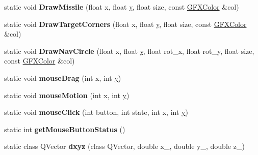 \begin{DoxyCompactItemize}
\item 
static void {\bfseries Draw\+Missile} (float x, float \hyperlink{IceUtils_8h_aa7ffaed69623192258fb8679569ff9ba}{y}, float size, const \hyperlink{structGFXColor}{G\+F\+X\+Color} \&col)\hypertarget{classNavigationSystem_a4e847da9a1c65bcbd989e7c1c2f6ac8e}{}\label{classNavigationSystem_a4e847da9a1c65bcbd989e7c1c2f6ac8e}

\item 
static void {\bfseries Draw\+Target\+Corners} (float x, float \hyperlink{IceUtils_8h_aa7ffaed69623192258fb8679569ff9ba}{y}, float size, const \hyperlink{structGFXColor}{G\+F\+X\+Color} \&col)\hypertarget{classNavigationSystem_a667563b1750a9fa2fb40359b5d0c2ffe}{}\label{classNavigationSystem_a667563b1750a9fa2fb40359b5d0c2ffe}

\item 
static void {\bfseries Draw\+Nav\+Circle} (float x, float \hyperlink{IceUtils_8h_aa7ffaed69623192258fb8679569ff9ba}{y}, float rot\+\_\+x, float rot\+\_\+y, float size, const \hyperlink{structGFXColor}{G\+F\+X\+Color} \&col)\hypertarget{classNavigationSystem_a548033f40a171175396d07efb32f7a85}{}\label{classNavigationSystem_a548033f40a171175396d07efb32f7a85}

\item 
static void {\bfseries mouse\+Drag} (int x, int \hyperlink{IceUtils_8h_aa7ffaed69623192258fb8679569ff9ba}{y})\hypertarget{classNavigationSystem_a55f6a4f06ba5c8e805e2d5eb814b5d12}{}\label{classNavigationSystem_a55f6a4f06ba5c8e805e2d5eb814b5d12}

\item 
static void {\bfseries mouse\+Motion} (int x, int \hyperlink{IceUtils_8h_aa7ffaed69623192258fb8679569ff9ba}{y})\hypertarget{classNavigationSystem_aa594e49889c880d5d6655b531c32ce15}{}\label{classNavigationSystem_aa594e49889c880d5d6655b531c32ce15}

\item 
static void {\bfseries mouse\+Click} (int button, int state, int x, int \hyperlink{IceUtils_8h_aa7ffaed69623192258fb8679569ff9ba}{y})\hypertarget{classNavigationSystem_ac1b646696db24ec1e6e943d105359a3d}{}\label{classNavigationSystem_ac1b646696db24ec1e6e943d105359a3d}

\item 
static int {\bfseries get\+Mouse\+Button\+Status} ()\hypertarget{classNavigationSystem_aa76e7f3c5f87b317ca9ec30e8f8d1b72}{}\label{classNavigationSystem_aa76e7f3c5f87b317ca9ec30e8f8d1b72}

\item 
static class Q\+Vector {\bfseries dxyz} (class Q\+Vector, double x\+\_\+, double y\+\_\+, double z\+\_\+)\hypertarget{classNavigationSystem_ae061f8f8a500712c0b1a49a97a4f9f10}{}\label{classNavigationSystem_ae061f8f8a500712c0b1a49a97a4f9f10}

\end{DoxyCompactItemize}
